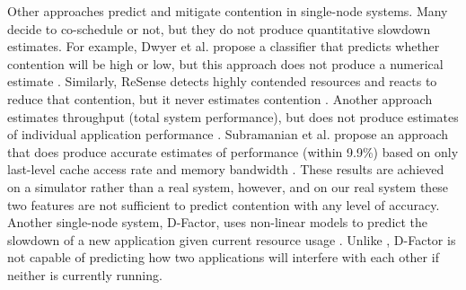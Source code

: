 Other approaches predict and mitigate contention in single-node
systems.  Many decide to co-schedule or not, but they do not produce
quantitative slowdown estimates.  For example, Dwyer et al. propose a
classifier that predicts whether contention will be high or low, but
this approach does not produce a numerical estimate
\cite{dwyer2012practical}.  Similarly, ReSense detects highly
contended resources and reacts to reduce that contention, but it never
estimates contention \cite{resense}. Another approach estimates
throughput (total system performance), but does not produce estimates
of individual application performance
\cite{xu2010cache,chen2010performance}.  Subramanian et al. propose an
approach that does produce accurate estimates of performance (within
9.9\%) based on only last-level cache access rate and memory bandwidth
\cite{subramanian2015slowdown}.  These results are achieved on a
simulator rather than a real system, however, and on our real system
these two features are not sufficient to predict contention with any
level of accuracy.  Another single-node system, D-Factor, uses
non-linear models to predict the slowdown of a new application given
current resource usage \cite{Lim2012dfactor}.  Unlike \SYSTEMESP{},
D-Factor is not capable of predicting how two applications will
interfere with each other if neither is currently running.

